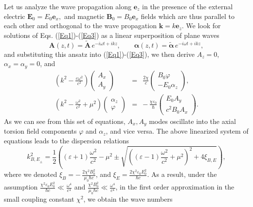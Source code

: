 \documentclass[12pt,prd,showkeys,amsmath,amssymb,nofootinbib]{revtex4-1}
\begin{document}
Let us analyze the wave propagation along $\bm{e}_z$ in the presence of the external electric $\bm{E}_0=E_0\bm{e}_x,$ and magnetic $\bm{B}_0=B_{0}\bm{e}_{x}$ fields which are thus parallel to each other and orthogonal to the wave propagation $\bm{k}=k\bm{e}_z$. We look for solutions of Eqs. (\ref{Eq1})-(\ref{Eq3}) as a linear superposition of plane waves
\begin{equation}
\bm{A}(z,t) = \widetilde{\bm{A}}\,e^{-i\omega t + ikz}, \qquad
\bm{\alpha}(z,t) = \widetilde{\bm{\alpha}}\,e^{-i\omega t + ikz},
\end{equation}
and substituting this ansatz into (\ref{Eq1})-(\ref{Eq3}), we then derive $A_z = 0$, $\alpha_x = \alpha_y = 0$, and
\begin{eqnarray}
\left(k^2 - \frac{\varepsilon\omega^2}{c^2}\right)\begin{pmatrix} A_x \\ A_y\end{pmatrix}
&=& \frac{2\chi}{c}\begin{pmatrix} B_0\varphi \\ - E_0\alpha_z\end{pmatrix},\\
\left(k^2 - \frac{\omega^2}{c^2}+\mu^2\right)\begin{pmatrix}\alpha_z \\ \varphi\end{pmatrix}
&=& -\,{\frac{\chi \varepsilon_0}{\hbar}}\begin{pmatrix} E_0A_y \\ c^2B_0A_x\end{pmatrix}.
\end{eqnarray}
As we can see from this set of equations, $A_{x}, A_y$ modes oscillate into the axial torsion field components $\varphi$ and $\alpha_z$, and vice versa. The above linearized system of equations leads to the dispersion relations
\begin{equation}
k^2_{{B,E}_\pm} = {\frac{1}{2}}\left((\varepsilon+1)\frac{\omega^2}{c^2} - \mu^2
\pm \sqrt{\left((\varepsilon - 1){\frac{\omega^2}{c^2}} + \mu^2\right)^2 + 4\xi_{B,E}}\right),
\end{equation}
where we denoted $\xi_B = -\,{\frac{2\chi^2 B_0^2}{\mu_0\hbar c}}$, and $\xi_E = {\frac{2\chi^2 \varepsilon_0E_0^2}{\hbar c}}$. As a result, under the assumption $\frac{\chi^2 \varepsilon_0E_0^2}{\hbar c} \ll \frac{\omega^4}{c^4}$ and $\frac{\chi^2 B_0^2}{\mu_0\hbar c} \ll \frac{\omega^4}{c^4}$, in the first order approximation in the small coupling constant $\chi^2$, we obtain the wave numbers 
\end{document}

